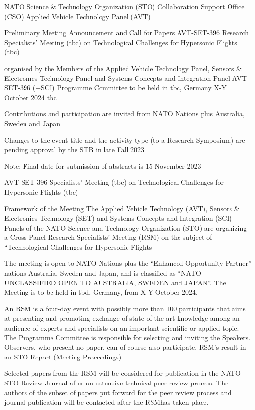 
NATO Science & Technology Organization (STO)
Collaboration Support Office (CSO)
Applied Vehicle Technology Panel (AVT)

Preliminary Meeting Announcement and 
Call for Papers
AVT-SET-396 Research Specialists’ Meeting (tbc)
on
Technological Challenges for Hypersonic Flights (tbc)

organised by the Members of the 
Applied Vehicle Technology Panel, Sensors & Electronics Technology Panel and Systems Concepts and Integration Panel
AVT-SET-396  (+SCI) Programme Committee
to be held in tbc, Germany
X-Y October 2024 tbc


Contributions and participation are invited from NATO Nations
plus Australia, Sweden and Japan

Changes to the event title and the activity type (to a Research Symposium) are pending approval by the STB in late Fall 2023

Note: Final date for submission of abstracts is 15 November 2023



AVT-SET-396 Specialists’ Meeting (tbc) on
Technological Challenges for Hypersonic Flights (tbc)

Framework of the Meeting
The Applied Vehicle Technology (AVT), Sensors & Electronics Technology (SET) and Systems Concepts and Integration (SCI) Panels of the NATO Science and Technology Organization (STO) are organizing a Cross Panel Research Specialists’ Meeting (RSM) on the subject of “Technological Challenges for Hypersonic Flights 

The meeting is open to NATO Nations plus the “Enhanced Opportunity Partner” nations Australia, Sweden and Japan, and is classified as “NATO UNCLASSIFIED OPEN TO AUSTRALIA, SWEDEN and JAPAN”. The Meeting is to be held in tbd, Germany, from X-Y October 2024.
 
An RSM is a four-day event with possibly more than 100 participants that aims at presenting and promoting exchange of state-of-the-art knowledge among an audience of experts and specialists on an important scientific or applied topic. The Programme Committee is responsible for selecting and inviting the Speakers. Observers, who present no paper, can of course also participate. RSM’s result in an STO Report (Meeting Proceedings). 

Selected papers from the RSM will be considered for publication in the NATO STO Review Journal after an extensive technical peer review process. The authors of the subset of papers put forward for the peer review process and journal publication will be contacted after the RSMhas taken place.

